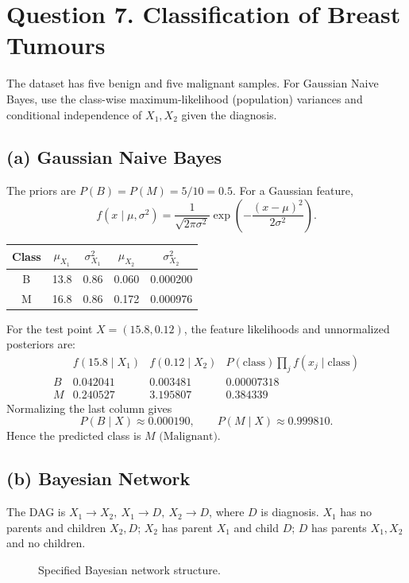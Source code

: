 \documentclass[11pt,a4paper]{article}
\begin{document}
\section*{Question 7. Classification of Breast Tumours}
The dataset has five benign and five malignant samples. For Gaussian Naive Bayes, use the class-wise maximum-likelihood (population) variances and conditional independence of \(X_1,X_2\) given the diagnosis.

\subsection*{(a) Gaussian Naive Bayes}
The priors are \(P(B)=P(M)=5/10=0.5\). For a Gaussian feature,
\[
f(x\mid\mu,\sigma^2)=\frac{1}{\sqrt{2\pi\sigma^2}}
\exp\left(-\frac{(x-\mu)^2}{2\sigma^2}\right).
\]

\begin{center}
\small
\begin{tabular}{c|cc|cc}
\toprule
Class & \(\mu_{X_1}\)&\(\sigma^2_{X_1}\)&\(\mu_{X_2}\)&\(\sigma^2_{X_2}\)\\
\midrule
B &13.8&0.86&0.060&0.000200\\
M &16.8&0.86&0.172&0.000976\\
\bottomrule
\end{tabular}
\end{center}
For the test point \(X=(15.8,0.12)\), the feature likelihoods and unnormalized posteriors are:
\[
\begin{array}{c|rrr}
&f(15.8\mid X_1)&f(0.12\mid X_2)&P(\text{class})\prod_j f(x_j\mid\text{class})\\ \hline
B&0.042041&0.003481&0.00007318\\
M&0.240527&3.195807&0.384339
\end{array}
\]
Normalizing the last column gives
\[
P(B\mid X)\approx0.000190,\qquad
P(M\mid X)\approx0.999810.
\]
Hence the predicted class is \(\boxed{M\text{ (Malignant)}}\).

\subsection*{(b) Bayesian Network}
The DAG is \(X_1\to X_2,\ X_1\to D,\ X_2\to D\), where \(D\) is diagnosis.
\(X_1\) has no parents and children \(X_2,D\); \(X_2\) has parent \(X_1\) and child \(D\); \(D\) has parents \(X_1,X_2\) and no children.

\begin{figure}[H]
\centering
{}
\caption{Specified Bayesian network structure.}
\label{fig:bayesian-network}
\end{figure}
\end{document}
